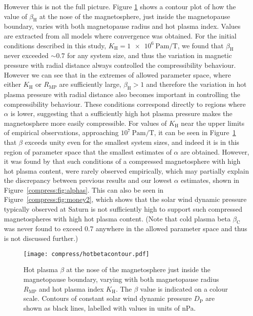 However this is not the full picture. Figure \ref{compress:fig:hotbetacontour} shows a contour plot of how the value of $\beta_\mathrm{H}$ at the nose of the magnetosphere, just inside the magnetopause boundary, varies with both magnetopause radius and hot plasma index. Values are extracted from all models where convergence was obtained. For the initial conditions described in this study, $K_\mathrm{H}=\SI{1e6}{\pascal\meter\per\tesla}$, we found that $\beta_\mathrm{H}$ never exceeded ${\sim}0.7$ for any system size, and thus the variation in magnetic pressure with radial distance always controlled the compressibility behaviour. However we can see that in the extremes of allowed parameter space, where either $K_\mathrm{H}$ or $R_\mathrm{MP}$ are sufficiently large, $\beta_\mathrm{H} > 1$ and therefore the variation in hot plasma pressure with radial distance also becomes important in controlling the compressibility behaviour. These conditions correspond directly to regions where $\alpha$ is lower, suggesting that a sufficiently high hot plasma pressure makes the magnetosphere more easily compressible. For values of $K_\mathrm{H}$ near the upper limits of empirical observations, approaching $10^7~\si{\pascal\meter\per\tesla}$, it can be seen in Figure~\ref{compress:fig:hotbetacontour} that $\beta$ exceeds unity even for the smallest system sizes, and indeed it is in this region of parameter space that the smallest estimates of $\alpha$ are obtained. However, it was found by \citet{pilkington2015} that such conditions of a compressed magnetosphere with high hot plasma content, were rarely observed empirically, which may partially explain the discrepancy between previous results and our lowest $\alpha$ estimates, shown in Figure~\ref{compress:fig:alphas}. This can also be seen in Figure~\ref{compress:fig:money2}, which shows that the solar wind dynamic pressure typically observed at Saturn is not sufficiently high to support such compressed magnetospheres with high hot plasma content. (Note that cold plasma beta $\beta_\mathrm{C}$ was never found to exceed 0.7 anywhere in the allowed parameter space and thus is not discussed further.)
\begin{figure}
\centering
\noindent\texttt{[image: compress/hotbetacontour.pdf]}
\caption[Map of hot plasma $\beta$ just inside the magnetopause boundary in system size, $K_\mathrm{H}$ parameter space.]{Hot plasma $\beta$ at the nose of the magnetosphere just inside the magnetopause boundary, varying with both magnetopause radius $R_\mathrm{MP}$ and hot plasma index $K_\mathrm{H}$. The $\beta$ value is indicated on a colour scale. Contours of constant solar wind dynamic pressure $D_\mathrm{P}$ are shown as black lines, labelled with values in units of nPa.}
\label{compress:fig:hotbetacontour}
\end{figure}

